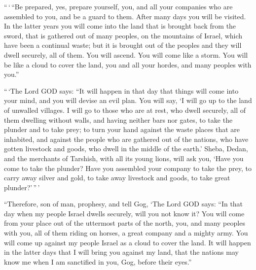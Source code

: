  ``\,`\,``Be prepared, yes, prepare yourself, you, and all
your companies who are assembled to you, and be a guard to them.
 After many days you will be visited. In the latter years
you will come into the land that is brought back from the sword, that is
gathered out of many peoples, on the mountains of Israel, which have
been a continual waste; but it is brought out of the peoples and they
will dwell securely, all of them.  You will ascend. You
will come like a storm. You will be like a cloud to cover the land, you
and all your hordes, and many peoples with you.''

 ``\,`The Lord GOD says: ``It will happen in that day
that things will come into your mind, and you will devise an evil plan.
 You will say, `I will go up to the land of unwalled
villages. I will go to those who are at rest, who dwell securely, all of
them dwelling without walls, and having neither bars nor gates,
 to take the plunder and to take prey; to turn your hand
against the waste places that are inhabited, and against the people who
are gathered out of the nations, who have gotten livestock and goods,
who dwell in the middle of the earth.'  Sheba, Dedan, and
the merchants of Tarshish, with all its young lions, will ask you, `Have
you come to take the plunder? Have you assembled your company to take
the prey, to carry away silver and gold, to take away livestock and
goods, to take great plunder?'\,''\,'

 ``Therefore, son of man, prophesy, and tell Gog, `The
Lord GOD says: ``In that day when my people Israel dwells securely, will
you not know it?  You will come from your place out of
the uttermost parts of the north, you, and many peoples with you, all of
them riding on horses, a great company and a mighty army.
 You will come up against my people Israel as a cloud to
cover the land. It will happen in the latter days that I will bring you
against my land, that the nations may know me when I am sanctified in
you, Gog, before their eyes.''

